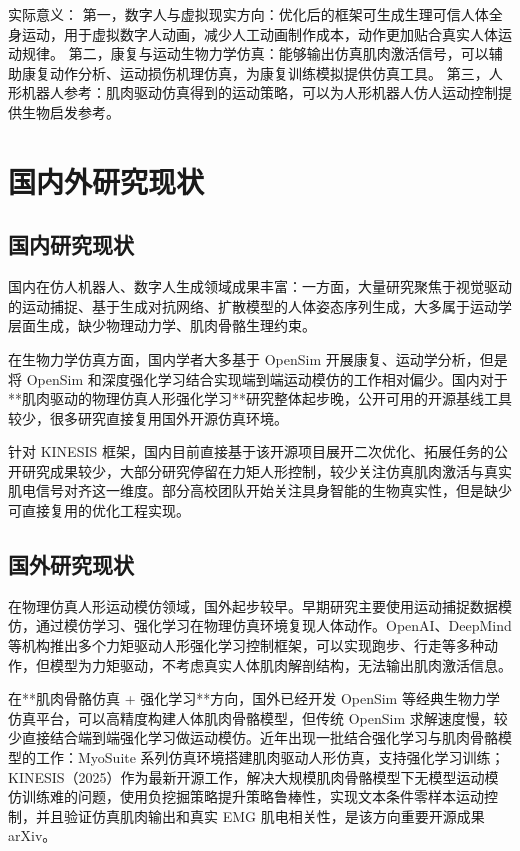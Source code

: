 实际意义：
第一，数字人与虚拟现实方向：优化后的框架可生成生理可信人体全身运动，用于虚拟数字人动画，减少人工动画制作成本，动作更加贴合真实人体运动规律。
第二，康复与运动生物力学仿真：能够输出仿真肌肉激活信号，可以辅助康复动作分析、运动损伤机理仿真，为康复训练模拟提供仿真工具。
第三，人形机器人参考：肌肉驱动仿真得到的运动策略，可以为人形机器人仿人运动控制提供生物启发参考。

\section{国内外研究现状}

\subsection{国内研究现状}
国内在仿人机器人、数字人生成领域成果丰富：一方面，大量研究聚焦于视觉驱动的运动捕捉、基于生成对抗网络、扩散模型的人体姿态序列生成，大多属于运动学层面生成，缺少物理动力学、肌肉骨骼生理约束。

在生物力学仿真方面，国内学者大多基于 OpenSim 开展康复、运动学分析，但是将 OpenSim 和深度强化学习结合实现端到端运动模仿的工作相对偏少。国内对于**肌肉驱动的物理仿真人形强化学习**研究整体起步晚，公开可用的开源基线工具较少，很多研究直接复用国外开源仿真环境。

针对 KINESIS 框架，国内目前直接基于该开源项目展开二次优化、拓展任务的公开研究成果较少，大部分研究停留在力矩人形控制，较少关注仿真肌肉激活与真实肌电信号对齐这一维度。部分高校团队开始关注具身智能的生物真实性，但是缺少可直接复用的优化工程实现。
\subsection{国外研究现状}
在物理仿真人形运动模仿领域，国外起步较早。早期研究主要使用运动捕捉数据模仿，通过模仿学习、强化学习在物理仿真环境复现人体动作。OpenAI、DeepMind 等机构推出多个力矩驱动人形强化学习控制框架，可以实现跑步、行走等多种动作，但模型为力矩驱动，不考虑真实人体肌肉解剖结构，无法输出肌肉激活信息。

在**肌肉骨骼仿真 + 强化学习**方向，国外已经开发 OpenSim 等经典生物力学仿真平台，可以高精度构建人体肌肉骨骼模型，但传统 OpenSim 求解速度慢，较少直接结合端到端强化学习做运动模仿。近年出现一批结合强化学习与肌肉骨骼模型的工作：MyoSuite 系列仿真环境搭建肌肉驱动人形仿真，支持强化学习训练；KINESIS（2025）作为最新开源工作，解决大规模肌肉骨骼模型下无模型运动模仿训练难的问题，使用负挖掘策略提升策略鲁棒性，实现文本条件零样本运动控制，并且验证仿真肌肉输出和真实 EMG 肌电相关性，是该方向重要开源成果arXiv。

